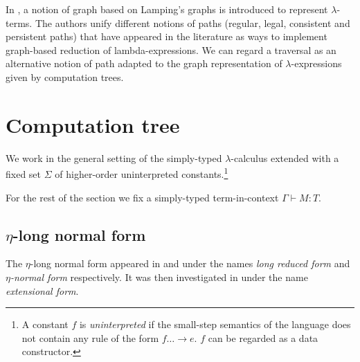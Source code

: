 In \cite{DBLP:conf/lics/AspertiDLR94}, a notion of graph based on Lamping's graphs \citep{lamping} is introduced to represent $\lambda$-terms. The authors unify different notions of paths (regular, legal, consistent and persistent paths) that have appeared in the literature as ways to implement graph-based reduction of lambda-expressions. We can regard a traversal as an alternative notion of path adapted to the graph representation of $\lambda$-expressions given by computation trees.

%

\section{Computation tree}
We work in the general setting of the simply-typed
$\lambda$-calculus extended with a fixed set $\Sigma$ of
higher-order uninterpreted constants.\footnote{A constant $f$ is
  \emph{uninterpreted} if the small-step semantics of the language
  does not contain any rule of the form $f \dots \rightarrow e$. $f$
  can be regarded as a data constructor.}

For the rest of the section we fix a simply-typed term-in-context
$\Gamma \vdash M :T$.

\subsection{$\eta$-long normal form}

The $\eta$-long normal form appeared in
\citep{DBLP:journals/tcs/JensenP76} and
\citep{DBLP:journals/tcs/Huet75} under the names \emph{long reduced
form} and \emph{$\eta$-normal form} respectively. It was then
investigated in \citep{huet76} under the name \emph{extensional
form}.

